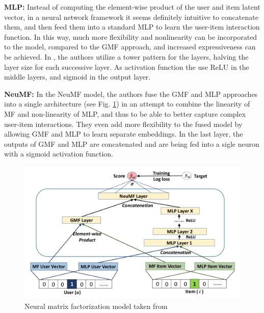 \textbf{MLP:}
Instead of computing the element-wise product of the user and item latent vector, in a neural network framework it seems definitely intuitive to concatenate them, and then feed them into a standard MLP to learn the user-item interaction function.
In this way, much more flexibility and nonlinearity can be incorporated to the model, compared to the GMF approach, and increased expressiveness can be achieved. 
In \cite{he2017neural}, the authors utilize a tower pattern for the layers, halving the layer size for each successive layer.
As activation function the use ReLU in the middle layers, and sigmoid in the output layer.

\textbf{NeuMF:}
In the NeuMF model, the authors fuse the GMF and MLP approaches into a single architecture (see Fig. \ref{fig:neumf}) in an attempt to combine the linearity of MF and non-linearity of MLP, and thus to be able to better capture complex user-item interactions.
They even add more flexibility to the fused model by allowing GMF and MLP to learn separate embeddings.
In the last layer, the outputs of GMF and MLP are concatenated and are being fed into a sigle neuron with a sigmoid activation function.

\begin{figure}[t]
    \centering
    \includegraphics[width=0.8\linewidth]{images/neumf.png}
    \caption{Neural matrix factorization model taken from \cite{he2017neural}}
    \label{fig:neumf}
\end{figure}

